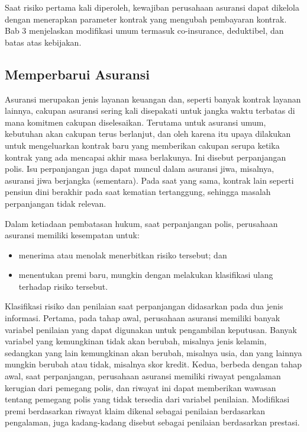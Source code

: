 \documentclass[
]{book}
\providecommand{\tightlist}{%
  \setlength{\itemsep}{0pt}\setlength{\parskip}{0pt}}
\begin{document}
Saat risiko pertama kali diperoleh, kewajiban perusahaan asuransi dapat dikelola dengan menerapkan parameter kontrak yang mengubah pembayaran kontrak. Bab 3 menjelaskan modifikasi umum termasuk co-insurance, deduktibel, dan batas atas kebijakan.

\hypertarget{memperbarui-asuransi}{%
\subsection{Memperbarui Asuransi}\label{memperbarui-asuransi}}

Asuransi merupakan jenis layanan keuangan dan, seperti banyak kontrak layanan lainnya, cakupan asuransi sering kali disepakati untuk jangka waktu terbatas di mana komitmen cakupan diselesaikan. Terutama untuk asuransi umum, kebutuhan akan cakupan terus berlanjut, dan oleh karena itu upaya dilakukan untuk mengeluarkan kontrak baru yang memberikan cakupan serupa ketika kontrak yang ada mencapai akhir masa berlakunya. Ini disebut perpanjangan polis. Isu perpanjangan juga dapat muncul dalam asuransi jiwa, misalnya, asuransi jiwa berjangka (sementara). Pada saat yang sama, kontrak lain seperti pensiun dini berakhir pada saat kematian tertanggung, sehingga masalah perpanjangan tidak relevan.

Dalam ketiadaan pembatasan hukum, saat perpanjangan polis, perusahaan asuransi memiliki kesempatan untuk:

\begin{itemize}
\tightlist
\item
  menerima atau menolak menerbitkan risiko tersebut; dan
\item
  menentukan premi baru, mungkin dengan melakukan klasifikasi ulang terhadap risiko tersebut.
\end{itemize}

Klasifikasi risiko dan penilaian saat perpanjangan didasarkan pada dua jenis informasi. Pertama, pada tahap awal, perusahaan asuransi memiliki banyak variabel penilaian yang dapat digunakan untuk pengambilan keputusan. Banyak variabel yang kemungkinan tidak akan berubah, misalnya jenis kelamin, sedangkan yang lain kemungkinan akan berubah, misalnya usia, dan yang lainnya mungkin berubah atau tidak, misalnya skor kredit. Kedua, berbeda dengan tahap awal, saat perpanjangan, perusahaan asuransi memiliki riwayat pengalaman kerugian dari pemegang polis, dan riwayat ini dapat memberikan wawasan tentang pemegang polis yang tidak tersedia dari variabel penilaian. Modifikasi premi berdasarkan riwayat klaim dikenal sebagai penilaian berdasarkan pengalaman, juga kadang-kadang disebut sebagai penilaian berdasarkan prestasi.
\end{document}
